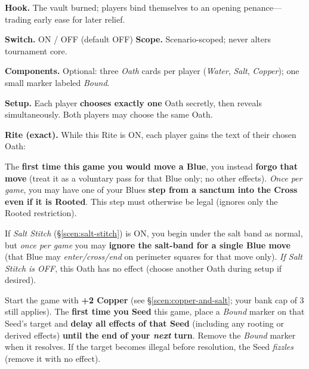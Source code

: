 \documentclass[11pt]{article}
\numberwithin{equation}{section} %
\theoremstyle{plain} %
\theoremstyle{definition} %
\theoremstyle{remark} %
\begin{document}
\noindent\textbf{Hook.} The vault burned; players bind themselves to an opening penance---trading early ease for later relief.

\medskip
\noindent\textbf{Switch.} \textsc{ON / OFF} (default \textsc{OFF}) \hfill \textbf{Scope.} Scenario-scoped; never alters tournament core.

\medskip
\noindent\textbf{Components.} Optional: three \emph{Oath} cards per player (\textit{Water}, \textit{Salt}, \textit{Copper}); one small marker labeled \emph{Bound}.

\medskip
\noindent\textbf{Setup.} Each player \textbf{chooses exactly one} Oath secretly, then reveals simultaneously. Both players may choose the same Oath.

\medskip
\noindent\textbf{Rite (exact).} While this Rite is \textsc{ON}, each player gains the text of their chosen Oath:

\begin{description}\setlength\itemsep{0.35em}
  \item[\textit{Oath of Water.}] The \textbf{first time this game you would move a Blue}, you instead \textbf{forgo that move} (treat it as a voluntary pass for that Blue only; no other effects). \emph{Once per game}, you may have one of your Blues \textbf{step from a sanctum into the Cross even if it is Rooted}. This step must otherwise be legal (ignores only the Rooted restriction).

  \item[\textit{Oath of Salt.}] If \emph{Salt Stitch} (\S\ref{scen:salt-stitch}) is \textsc{ON}, you begin under the salt band as normal, but \emph{once per game} you may \textbf{ignore the salt-band for a single Blue move} (that Blue may \emph{enter/cross/end} on perimeter squares for that move only). \emph{If Salt Stitch is \textsc{OFF}}, this Oath has no effect (choose another Oath during setup if desired).

  \item[\textit{Oath of Copper.}] Start the game with \textbf{+2 Copper} (see \S\ref{scen:copper-and-salt}; your bank cap of 3 still applies). The \textbf{first time you Seed} this game, place a \emph{Bound} marker on that Seed's target and \textbf{delay all effects of that Seed} (including any rooting or derived effects) \textbf{until the end of your \emph{next} turn}. Remove the \emph{Bound} marker when it resolves. If the target becomes illegal before resolution, the Seed \emph{fizzles} (remove it with no effect).
\end{description}
\end{document}
